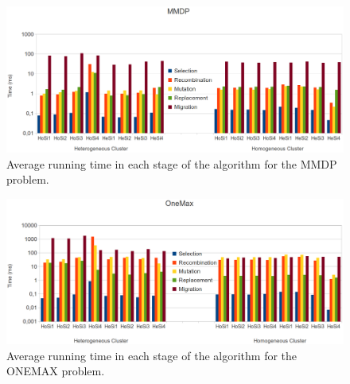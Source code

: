 \begin{figure}
\centering
\includegraphics[scale =0.19] {gfx/adaptiveresults/timingMMDP.png}
\caption{Average running time in each stage of the algorithm for the MMDP problem.}
\label{fig:MMDPbars}
\end{figure}

\begin{figure}
\centering
\includegraphics[scale =0.19] {gfx/adaptiveresults/timingONEMAX.png}
\caption{Average running time in each stage of the algorithm for the ONEMAX problem.}
\label{fig:ONEMAXbars}
\end{figure}

